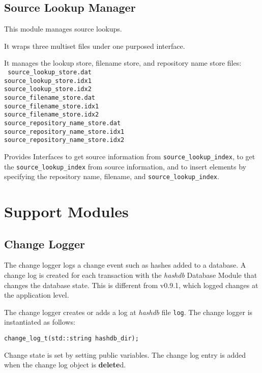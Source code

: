 \documentclass[12pt,twoside]{article}
\newcommand{\hdb}{\emph{hashdb}\xspace}
\begin{document}
\subsection{Source Lookup Manager}
This module manages source lookups.
\begin{compactitem}
\item It wraps three multiset files under one purposed interface.
\item It manages the lookup store, filename store,
and repository name store files: \\
\texttt{
source\_lookup\_store.dat \\
source\_lookup\_store.idx1 \\
source\_lookup\_store.idx2 \\
source\_filename\_store.dat \\
source\_filename\_store.idx1 \\
source\_filename\_store.idx2 \\
source\_repository\_name\_store.dat \\
source\_repository\_name\_store.idx1 \\
source\_repository\_name\_store.idx2 \\
}
\item Provides Interfaces to get source information
from \texttt{source\_lookup\_index},
to get the \texttt{source\_lookup\_index} from source information,
and to insert elements by specifying the repository name, filename,
and \texttt{source\_lookup\_index}.
\end{compactitem}

\section{Support Modules}
\subsection{Change Logger}
The change logger logs a change event such as hashes added to a database.
A change log is created for each transaction with the \hdb Database Module
that changes the database state.
This is different from v0.9.1, which logged changes at the application level.

The change logger creates or adds a log at \hdb file \texttt{log}.
The change logger is instantiated as follows:
\begin{small}
\begin{verbatim}
change_log_t(std::string hashdb_dir);
\end{verbatim}
\end{small}
Change state is set by setting public variables.
The change log entry is added when the change log object is \textbf{delete}d.
\end{document}
